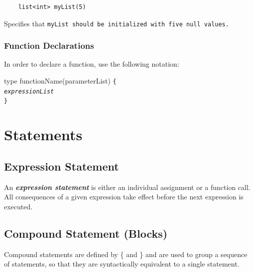 \documentclass{article}
\begin{document}
\begin{verbatim}
    list<int> myList(5)
\end{verbatim}

Specifies that \tt myList \rm should be initialized with five \tt null \rm values.


\subsubsection{Function Declarations} %
\label{ssub:function_declarations}

In order to declare a function, use the following notation:

\indent type functionName(parameterList) \tt \{ \rm \\
\indent \indent \emph{expressionList} \\
\indent \tt \} 





\section{Statements} %
\label{sec:statements}

\subsection{Expression Statement} %
\label{sub:expression_statement}

An \textbf{\emph{expression statement}} is either an individual assignment or a
function call. All consequences of a given expression take effect before the next
expression is executed.


\subsection{Compound Statement (Blocks)} %
\label{sub:compound_statement}

Compound statements are defined by \{ and \} and are used to group a sequence of
statements, so that they are syntactically equivalent to a single statement.

\end{document}
